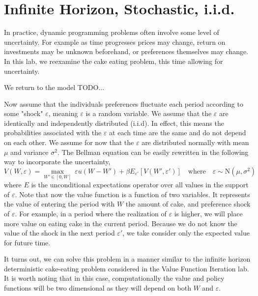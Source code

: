 \newcommand\ve{\varepsilon}


\section{Infinite Horizon, Stochastic, i.i.d.}\label{SecRecProbInfinHorStochiid}

In practice, dynamic programming problems often involve some level of uncertainty.  For example as time progresses prices may change, return on investments may be unknown beforehand, or preferences themselves may change.  In this lab, we reexamine the cake eating problem, this time allowing for uncertainty.

We return to the model TODO...

Now assume that the individuals preferences fluctuate each period according to some "shock" $\ve$, meaning $\ve$ is a random variable.  We assume that the $\ve$ are identically and independently distributed (i.i.d).  In effect, this means the probabilities associated with the $\ve$ at each time are the same and do not depend on each other.  We assume for now that the $\ve$ are distributed normally with mean $\mu$ and variance $\sigma^2$.  The Bellman equation can be easily rewritten in the following way to incorporate the uncertainty,
\begin{equation*}\label{stoch_Bellman}
   V\left(W,\ve\right) = \max_{W'\in[0,W]}\: \ve u\left(W - W'\right) + \beta E_{\ve'}\left[V\left(W',\ve'\right)\right] \quad\text{where}\quad \ve \sim \text{N}(\mu,\sigma^2)
\end{equation*}
where $E$ is the unconditional expectations operator over all values in the support of $\ve$.  Note that now the value function is a function of two variables.  It represents the value of entering the period with $W$ the amount of cake, and preference shock of $\ve$.  For example, in a period where the realization of $\ve$ is higher, we will place more value on eating cake in the current period.  Because we do not know the value of the shock in the next period $\ve'$, we take consider only the expected value for future time.

It turns out, we can solve this problem in a manner similar to the infinite horizon deterministic cake-eating problem considered in the Value Function Iteration lab.  It is worth noting that in this case, computationally the value and policy functions will be two dimensional as they will depend on both $W$ and $\ve$.  

